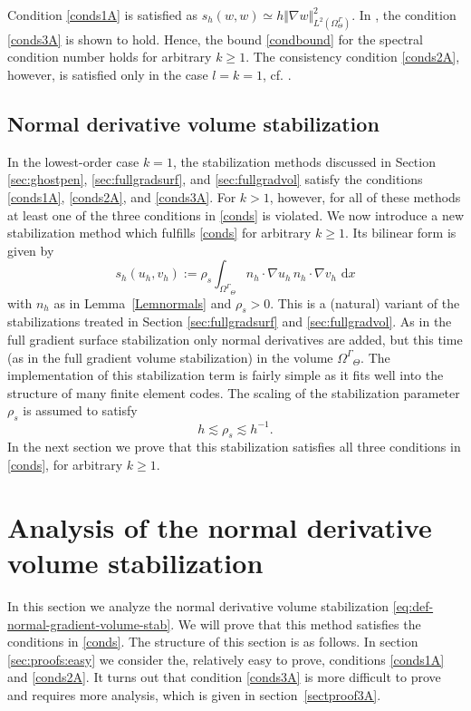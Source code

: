\documentclass[final]{siamltex}
\begin{document}
Condition \eqref{conds1A} is satisfied as $s_h(w,w) \simeq h \Vert \nabla w \Vert_{L^2(\Omega_\Theta^\Gamma)}^2$. In \cite[Lemma 4.2]{burman16fullgradcmame}, the condition \eqref{conds3A} is shown to hold. Hence, the bound \eqref{condbound} for the spectral condition number holds for arbitrary $k \geq 1$. 
The consistency condition \eqref{conds2A}, however, is satisfied only in the case $l=k=1$, cf. \cite[Lemma 6.2, Term III]{burman16fullgradcmame}.

\subsection{Normal derivative volume stabilization}
\label{sec:normal-derivative-volume}
In the lowest-order case $k=1$, the stabilization methods discussed in Section \ref{sec:ghostpen}, \ref{sec:fullgradsurf}, and \ref{sec:fullgradvol} satisfy the conditions \eqref{conds1A}, \eqref{conds2A}, and \eqref{conds3A}. For $k>1$, however, for all of these methods at least one of the three conditions in \eqref{conds} is violated. 
We now introduce a new stabilization method which fulfills \eqref{conds} for arbitrary $k \geq 1$. Its bilinear form is given by
\begin{equation}\label{eq:def-normal-gradient-volume-stab}
 s_h(u_h,v_h):= \rho_s \int_{{\Omega^{\Gamma}}_\Theta} n_h \cdot \nabla u_h \, n_h \cdot \nabla v_h \, {\,\mathrm{d} {x}}
\end{equation}
with $n_h$ as in Lemma~\ref{Lemnormals} and $\rho_s>0$.
This is a (natural) variant of the stabilizations treated in Section \ref{sec:fullgradsurf} and \ref{sec:fullgradvol}. As in the full gradient surface stabilization only normal derivatives are added, but this time (as in the full gradient volume stabilization) in the volume ${\Omega^{\Gamma}}_\Theta$. 
The implementation of this stabilization term is fairly simple as it fits well into the structure of many finite element codes.
The scaling of the stabilization parameter $\rho_s$ is assumed to satisfy
\begin{equation}\label{eq:as-rho}
  h \lesssim \rho_s \lesssim h^{-1}.
\end{equation}
In the next section we prove that this stabilization satisfies all three conditions in \eqref{conds}, for arbitrary $k \geq 1$.

\section{Analysis of the normal derivative volume stabilization} \label{sec:new-stab}
 In this section we analyze the normal derivative volume stabilization \eqref{eq:def-normal-gradient-volume-stab}. We will prove that this method satisfies the conditions in \eqref{conds}. 
 The structure of this section is as follows. In section \ref{sec:proofs:easy} we consider the, relatively easy to prove, conditions \eqref{conds1A} and \eqref{conds2A}. It turns out that condition \eqref{conds3A} is more difficult to prove and requires more analysis, which is given in section~\ref{sectproof3A}.
\end{document}
